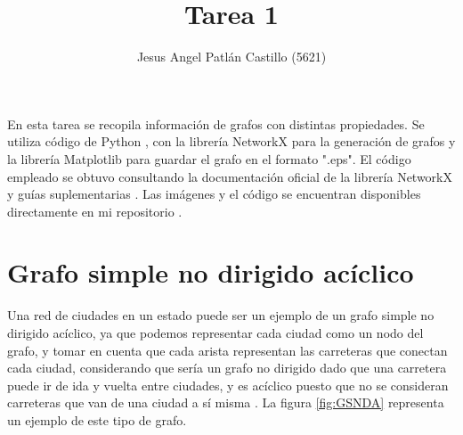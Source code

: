 \documentclass{article}
\title{Tarea 1}
\author{Jesus Angel Patlán Castillo (5621)}
\date{\displaydate{date}}
\begin{document}
 
 
\lstset{style=mystyle}


\maketitle

En esta tarea se recopila información de grafos con distintas propiedades. Se utiliza código de Python \cite{Python}, con la librería NetworkX \cite{NetworkX} para la generación de grafos y la librería Matplotlib \cite{Matplotlib} para guardar el grafo en el formato ".eps". El código empleado se obtuvo consultando la documentación oficial de la librería NetworkX \cite{NetworkXD} y guías suplementarias \cite{SOQ1} \cite{SOQ2}. Las imágenes y el código se encuentran disponibles directamente en mi repositorio \cite{JAPC}.


\section{Grafo simple no dirigido acíclico}
Una red de ciudades en un estado puede ser un ejemplo de un grafo simple no dirigido acíclico, ya que podemos representar cada ciudad como un nodo del grafo, y tomar en cuenta que cada arista representan las carreteras que conectan cada ciudad, considerando que sería un grafo no dirigido dado que una carretera puede ir de ida y vuelta entre ciudades, y es acíclico puesto que no se consideran carreteras que van de una ciudad a sí misma \cite{novo2004aplicaciones}. La figura \ref{fig:GSNDA} representa un ejemplo de este tipo de grafo.
\end{document}
